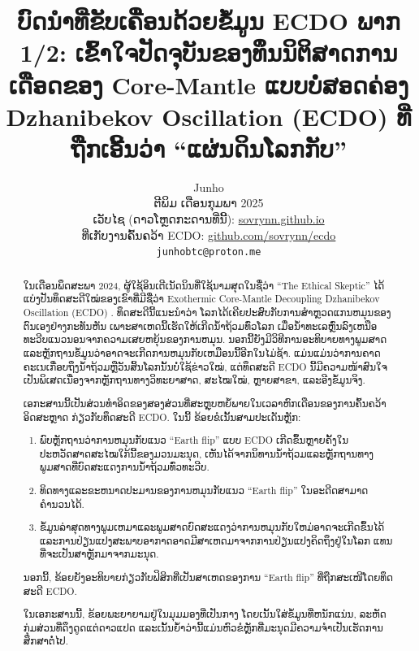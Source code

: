 \documentclass[10pt,twocolumn,letterpaper]{article}
\begin{document}
\title{ບົດນຳທີ່ຂັບເຄື່ອນດ້ວຍຂໍ້ມູນ ECDO ພາກ 1/2: ເຂົ້າໃຈປັດຈຸບັນຂອງທຶນນິຕິສາດການເດືອດຂອງ Core-Mantle ແບບບໍ່ສອດຄ່ອງ Dzhanibekov Oscillation (ECDO) ທີ່ຖືກເອີ້ນວ່າ “ແຜ່ນດິນໂລກກັບ”}

\author{Junho\\
ຕີພິມ ເດືອນກຸມພາ 2025\\
ເວັບໄຊ (ດາວໂຫຼດກະດານທີ່ນີ້): \href{https://sovrynn.github.io}{sovrynn.github.io}\\
ທີ່ເກັບງານຄົ້ນຄວ້າ ECDO: \href{https://github.com/sovrynn/ecdo}{github.com/sovrynn/ecdo}\\
{\tt\small junhobtc@proton.me}
}

\maketitle

\begin{abstract}
ໃນເດືອນພຶດສະພາ 2024, ຜູ້ໃຊ້ອິນເຕີເນັດນິນທີ່ໃຊ້ນາມສຸດໃນຊື່ວ່າ “The Ethical Skeptic” \cite{0} ໄດ້ແບ່ງປັນທຶດສະດີໃໝ່ຂອງເຂົາທີ່ມີຊື່ວ່າ Exothermic Core-Mantle Decoupling Dzhanibekov Oscillation (ECDO) \cite{1}. ທຶດສະດີນີ້ແນະນຳວ່າ ໂລກໄດ້ເຄີຍປະສົບກັບການສຳຫຼວດແກນຫມຸນຂອງຕົນເອງຢ່າງກະທັນຫັນ ເພາະສາເຫດນີ້ເຮັດໃຫ້ເກີດນ້ຳຖ້ວມທົ່ວໂລກ ເມື່ອນ້ຳທະເລຫຼົ່ນລົງເຫນືອທະວີບແນວນອນຈາກຄວາມເສຍຫຍຸ້ນຂອງການຫມຸນ. ນອກນີ້ຍັງມີວິທີການອະທິບາຍທາງພູມສາດແລະຫຼັກຖານຂໍ້ມູນວ່າອາດຈະເກີດການຫມຸນກັບເຫມືອນນີ້ອີກໃນໄມ່ຊ້າ. ແມ່ນແມ່ນວ່າການຄາດຄະເນເກື່ອບຖຶງນ້ຳຖ້ວມຫຼືວັນສິ້ນໂລກນັ້ນບໍ່ໃຊ້ຂ່າວໃໝ່, ແຕ່ທຶດສະດີ ECDO ນີ້ມີຄວາມໜ້າສົນໃຈເປັນພິເສດເນື່ອງຈາກຫຼັກຖານທາງວິທະຍາສາດ, ສະໄໝໃໝ່, ຫຼາຍສາຂາ, ແລະອີງຂໍ້ມູນຈິງ.

ເອກະສານນີ້ເປັນສ່ວນທຳອິດຂອງສອງສ່ວນທີ່ສະຫຼຸບຫຍໍ້ພາຍໃນເວລາຫົກເດືອນຂອງການຄົ້ນຄວ້າອິດສະຫຼາດ \cite{2,20} ກ່ຽວກັບທຶດສະດີ ECDO. ໃນນີ້ ຂ້ອຍຂໍເນັ້ນສາມປະເດັນຫຼັກ:

\begin{flushleft}
\begin{enumerate}
    \item ພົບຫຼັກຖານວ່າການຫມຸນກັບແນວ “Earth flip” ແບບ ECDO ເກີດຂຶ້ນຫຼາຍຄັ້ງໃນປະຫວັດສາດສະໄໝໃກ້ນີ້ຂອງມວນມະນຸດ, ເຫັນໄດ້ຈາກນິທານນ້ຳຖ້ວມແລະຫຼັກຖານທາງພູມສາດທີ່ບົດສະແດງການນ້ຳຖ້ວມທົ່ວທະວີບ.
    \item ທິດທາງແລະຂະຫນາດປະມານຂອງການຫມຸນກັບແນວ “Earth flip” ໃນອະດີດສາມາດຄຳນວນໄດ້.
    \item ຂໍ້ມູນລ່າສຸດທາງພູມເຫມາແລະພູມສາດບົດສະແດງວ່າການຫມຸນກັບໃຫມ່ອາດຈະເກີດຂຶ້ນໄດ້ ແລະການປ່ຽນແປງສະພາບອາກາດອາດມີສາເຫດມາຈາກການປ່ຽນແປງຄິດຖຶງຢູ່ໃນໂລກ ແທນທີ່ຈະເປັນສາຫຼັກມາຈາກມະນຸດ.
\end{enumerate}
\end{flushleft}

ນອກນີ້, ຂ້ອຍຍັງອະທິບາຍກ່ຽວກັບຟິສິກທີ່ເປັນສາເຫດຂອງການ “Earth flip” ທີ່ຖືກສະເໜີໂດຍທຶດສະດີ ECDO.

ໃນເອກະສານນີ້, ຂ້ອຍພະຍາຍາມຢູ່ໃນມຸມມອງທີ່ເປັນກາງ ໂດຍເນັ້ນໃສ່ຂໍ້ມູນທີ່ຫນັກແນ່ນ, ລະຫັດກຸ່ມສ່ວນທີ່ດຶງດູດແຕ່ດາວແປດ ແລະເນັ້ນຍ້ຳວ່ານີ້ແມ່ນຫົວຂໍຫຼັກທີ່ມະນຸດມີຄວາມຈຳເປັນເຮັດການສຶກສາຕໍ່ໄປ.
\end{abstract}
\end{document}
